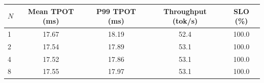 \begin{tabular}{lcccc}\toprule
$N$ & Mean TPOT (ms) & P99 TPOT (ms) & Throughput (tok/s) & SLO (\%)\\
\midrule
1 & 17.67 & 18.19 & 52.4 & 100.0\\
2 & 17.54 & 17.89 & 53.1 & 100.0\\
4 & 17.52 & 17.86 & 53.1 & 100.0\\
8 & 17.55 & 17.97 & 53.1 & 100.0\\
\bottomrule\end{tabular}
